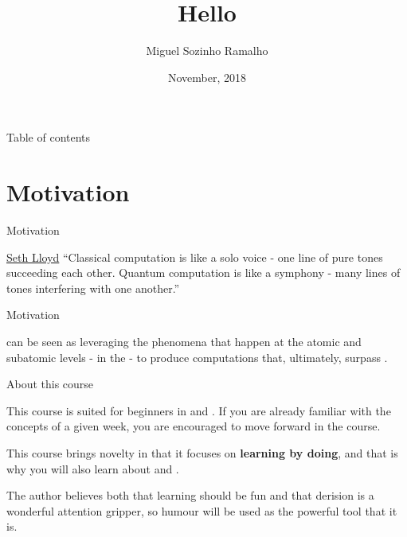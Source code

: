 \documentclass[aspectratio=43]{beamer}
\title{Hello \qw}
\date{November, 2018}
\author[Ramalho]{Miguel Sozinho Ramalho}
\begin{document}
\begin{frame}
	\titlepage
\end{frame}


\begin{frame}{Table of contents}
	\begin{card}
		\tableofcontents
	\end{card}
\end{frame}


\section{Motivation}
\begin{frame}{Motivation}
\begin{card}[Why]
    \begin{chapquote}[2pt]{\href{https://en.wikipedia.org/wiki/Seth_Lloyd}{Seth Lloyd}}
        ``Classical computation is like a solo voice - one line of pure tones succeeding each other. Quantum computation is like a symphony - many lines of tones interfering with one another.''
    \end{chapquote}
\end{card}

\pagenumber
\end{frame}

\begin{frame}{Motivation}
\begin{card}[How]
    \qc can be seen as leveraging the phenomena that happen at the atomic and subatomic levels - in the \qw\xspace- to produce computations that, ultimately, surpass \cc.
\end{card}
\pagenumber
\end{frame}

\begin{frame}{About this course}
\begin{card}
    This course is suited for beginners in \qm and \qc. If you are already familiar with the concepts of a given week, you are encouraged to move forward in the course. 
    
    This course brings novelty in that it focuses on \textbf{learning by doing}, and that is why you will also learn about \qk and \ibmqe.
    
    The author believes both that learning should be fun and that derision is a wonderful attention gripper, so humour will be used as the powerful tool that it is.
\end{card}
\pagenumber
\end{frame}
\end{document}
